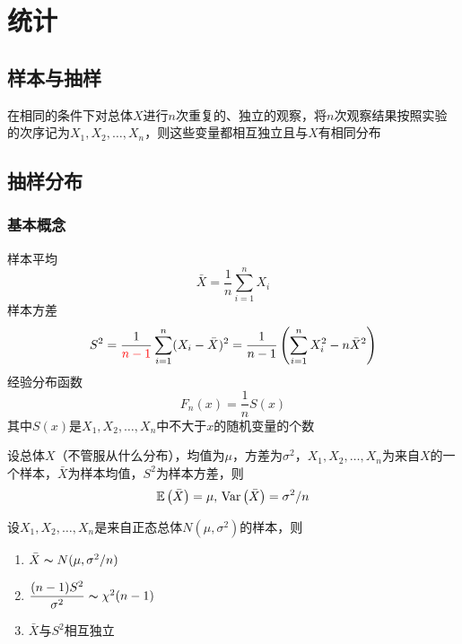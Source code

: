 
\section{统计}
\subsection{样本与抽样}
\begin{definition}[简单随机样本]
在相同的条件下对总体$X$进行$n$次重复的、独立的观察，将$n$次观察结果按照实验的次序记为$X_1,X_2,\ldots,X_n$，则这些变量都相互独立且与$X$有相同分布
\end{definition}

\subsection{抽样分布}
\subsubsection{基本概念}
\begin{definition}[统计量]
样本平均
\[\bar{X}=\frac{1}{n}\sum_{i=1}^nX_i\]
样本方差
\[S^2=\frac{1}{\textcolor{red}{n-1}}\sum_{i=1}^n(X_i-\bar{X})^2=\frac{1}{n-1}\left(\sum_{i=1}^nX_i^2-n\bar{X}^2\right)\]
经验分布函数
\[F_n(x)=\frac{1}{n}S(x)\]
其中$S(x)$是$X_1,X_2,\ldots,X_n$中不大于$x$的随机变量的个数
\end{definition}
\begin{theorem}
设总体$X$（不管服从什么分布），均值为$\mu$，方差为$\sigma^2$，$X_1,X_2,\ldots,X_n$为来自$X$的一个样本，$\bar{X}$为样本均值，$S^2$为样本方差，则
\[\mathbb{E}\left(\bar{X}\right)=\mu,\,\mathrm{Var}\left(\bar{X}\right)=\sigma^2/n\]
\end{theorem}
\begin{theorem}
设$X_1,X_2,\ldots,X_n$是来自正态总体$N(\mu,\sigma^2)$的样本，则
\begin{enumerate}
	\item $\bar{X}\thicksim N(\mu,\sigma^2/n)$
	\item $\dfrac{(n-1)S^2}{\sigma^2}\thicksim \chi^2(n-1)$
	\item $\bar{X}$与$S^2$相互独立
\end{enumerate}
\end{theorem}

